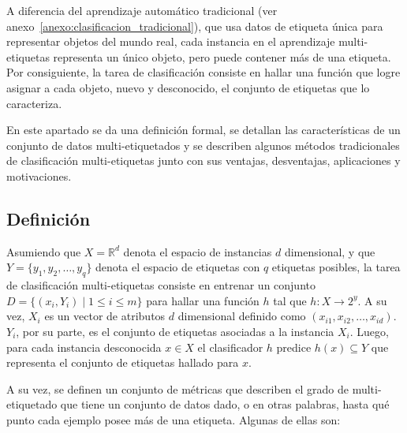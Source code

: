 A diferencia del aprendizaje automático tradicional (ver
anexo~\ref{anexo:clasificacion_tradicional}), que usa datos de etiqueta única
para representar objetos del mundo real, cada instancia en el aprendizaje
multi-etiquetas representa un único objeto, pero puede contener más de una
etiqueta. Por consiguiente, la tarea de clasificación consiste en hallar una
función que logre asignar a cada objeto, nuevo y desconocido, el conjunto de
etiquetas que lo caracteriza.

En este apartado se da una definición formal, se detallan las características de
un conjunto de datos multi-etiquetados y se  describen algunos métodos
tradicionales de clasificación multi-etiquetas junto con sus ventajas,
desventajas, aplicaciones y motivaciones.

\subsection{Definición}
\label{mll_def_formal}

Asumiendo que $X=\mathbb{R}^{d}$ denota el espacio de instancias $d$
dimensional, y que $Y = \{y_{1}, y_{2}, \dots, y_{q}\}$ denota el espacio de
etiquetas con $q$ etiquetas posibles, la tarea de clasificación multi-etiquetas
consiste en entrenar un conjunto $D = \{(x_{i}, Y_{i}) \mid 1 \leq i \leq m\}$
para hallar una función $h$ tal que $h: X \rightarrow 2^y$. A su vez, $X_{i}$ es
un vector de atributos $d$ dimensional definido como $(x_{i1}, x_{i2}, \dots,
	x_{id})$. $Y_{i}$, por su parte, es el conjunto de etiquetas asociadas a la
instancia $X_{i}$. Luego, para cada instancia desconocida $x \in X$ el
clasificador $h$ predice $h(x) \subseteq Y$ que representa el conjunto de
etiquetas hallado para $x$.

A su vez, se definen un conjunto de métricas que describen el grado de
multi-etiquetado que tiene un conjunto de datos dado, o en otras palabras, hasta
qué punto cada ejemplo posee más de una etiqueta. Algunas de ellas son:

